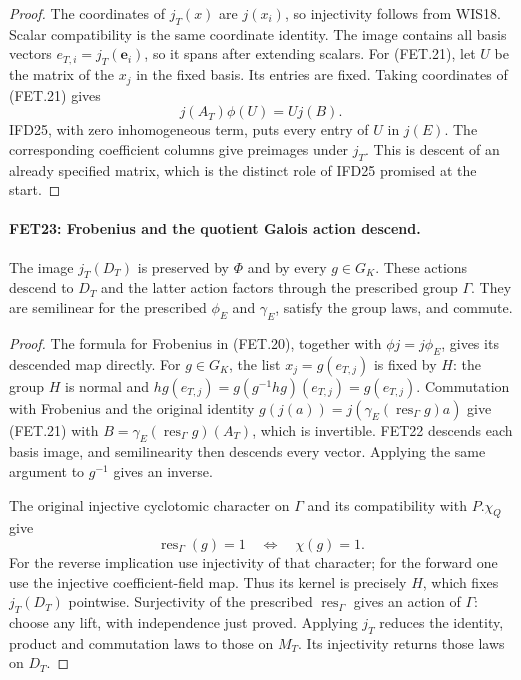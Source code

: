 \begin{proof}
The coordinates of $j_T(x)$ are $j(x_i)$, so injectivity follows
from WIS18. Scalar compatibility is the same coordinate identity.
The image contains all basis vectors $e_{T,i}=j_T(\mathbf e_i)$,
so it spans after extending scalars.
For (FET.21), let $U$ be the matrix of the $x_j$ in the fixed
basis. Its entries are fixed. Taking coordinates of (FET.21)
gives
\[
                       j(A_T)\phi(U)=Uj(B).
\]
IFD25, with zero inhomogeneous term, puts every entry of $U$
in $j(E)$. The corresponding coefficient columns give preimages
under $j_T$. This is descent of an already specified matrix,
which is the distinct role of IFD25 promised at the start.
\end{proof}

\paragraph{FET23: Frobenius and the quotient Galois action descend.}
\label{claim:FET23}
The image $j_T(D_T)$ is preserved by $\Phi$ and by every
$g\in G_K$. These actions descend to $D_T$ and the latter
action factors through the prescribed group $\Gamma$.
They are semilinear for the prescribed $\phi_E$ and
$\gamma_E$, satisfy the group laws, and commute.

\begin{proof}
The formula for Frobenius in (FET.20), together with
$\phi j=j\phi_E$, gives its descended map directly.
For $g\in G_K$, the list $x_j=g(e_{T,j})$ is fixed by $H$:
the group $H$ is normal and
$h g(e_{T,j})=g(g^{-1}hg)(e_{T,j})=g(e_{T,j})$.
Commutation with Frobenius and the original identity
$g(j(a))=j(\gamma_E(\operatorname{res}_\Gamma g)a)$ give
(FET.21) with
$B=\gamma_E(\operatorname{res}_\Gamma g)(A_T)$, which is
invertible. FET22 descends each basis image, and semilinearity
then descends every vector. Applying the same argument to
$g^{-1}$ gives an inverse.

The original injective cyclotomic character on $\Gamma$ and
its compatibility with $P.\chi_Q$ give
\[
             \operatorname{res}_\Gamma(g)=1
                        \quad\Longleftrightarrow\quad\chi(g)=1.
\]
For the reverse implication use injectivity of that character;
for the forward one use the injective coefficient-field map.
Thus its kernel is precisely $H$, which fixes $j_T(D_T)$
pointwise. Surjectivity of the prescribed
$\operatorname{res}_\Gamma$ gives an action of $\Gamma$:
choose any lift, with independence just proved. Applying $j_T$
reduces the identity, product and commutation laws to those on
$M_T$. Its injectivity returns those laws on $D_T$.
\end{proof}

